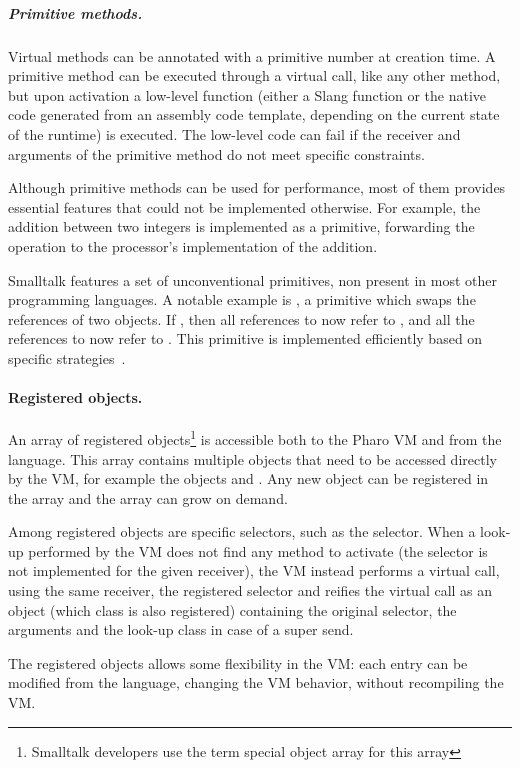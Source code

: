 \documentclass[a4paper,12pt,twoside]{../includes/ThesisStyle}
\begin{document}
\subparagraph{Primitive methods.}
\label{par:become}

Virtual methods can be annotated with a primitive number at creation time. A primitive method can be executed through a virtual call, like any other method, but upon activation a low-level function (either a Slang function or the native code generated from an assembly code template, depending on the current state of the runtime) is executed. The low-level code can fail if the receiver and arguments of the primitive method do not meet specific constraints. 

Although primitive methods can be used for performance, most of them provides essential features that could not be implemented otherwise. For example, the addition between two integers is implemented as a primitive, forwarding the operation to the processor's implementation of the addition.

Smalltalk features a set of unconventional primitives, non present in most other programming languages. A notable example is , a primitive which swaps the references of two objects. If , then all references to  now refer to , and all the references to  now refer to . This primitive is implemented efficiently based on specific strategies~\cite{Mir15a}.

\paragraph{Registered objects.} An array of registered objects\footnote{Smalltalk developers use the term special object array for this array} is accessible both to the Pharo VM and from the language. This array contains multiple objects that need to be accessed directly by the VM, for example the objects  and . Any new object can be registered in the array and the array can grow on demand.

Among registered objects are specific selectors, such as the  selector. When a look-up performed by the VM does not find any method to activate (the selector is not implemented for the given receiver), the VM instead performs a virtual call, using the same receiver, the registered  selector and reifies the virtual call as an object (which class is also registered) containing the original selector, the arguments and the look-up class in case of a super send. 

The registered objects allows some flexibility in the VM: each entry can be modified from the language, changing the VM behavior, without recompiling the VM.
\end{document}

